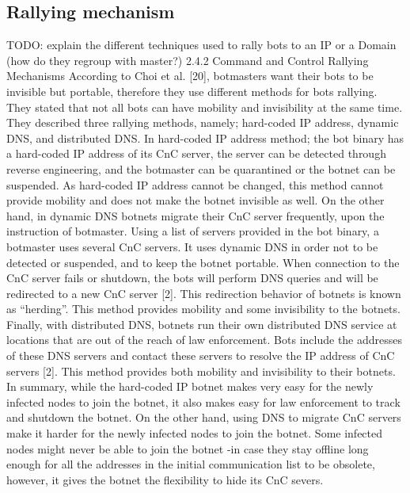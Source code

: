\subsection{Rallying mechanism}
TODO: explain the different techniques used to rally bots to an IP or a Domain (how do they regroup with master?)
2.4.2 Command and Control Rallying Mechanisms
According to Choi et al. [20], botmasters want their bots
to be invisible but portable, therefore they use different
methods for bots rallying. They stated that not all bots
can have mobility and invisibility at the same time. They
described three rallying methods, namely; hard-coded IP
address, dynamic DNS, and distributed DNS.
In hard-coded IP address method; the bot binary has a
hard-coded IP address of its CnC server, the server can be
detected through reverse engineering, and the botmaster
can be quarantined or the botnet can be suspended. As
hard-coded IP address cannot be changed, this method
cannot provide mobility and does not make the botnet
invisible as well. On the other hand, in dynamic DNS
botnets migrate their CnC server frequently, upon the
instruction of botmaster. Using a list of servers provided
in the bot binary, a botmaster uses several CnC servers.
It uses dynamic DNS in order not to be detected or suspended,
and to keep the botnet portable. When connection
to the CnC server fails or shutdown, the bots will
perform DNS queries and will be redirected to a new CnC
server [2]. This redirection behavior of botnets is known
as “herding”. This method provides mobility and some
invisibility to the botnets. Finally, with distributed DNS,
botnets run their own distributed DNS service at locations
that are out of the reach of law enforcement. Bots
include the addresses of these DNS servers and contact
these servers to resolve the IP address of CnC servers
[2]. This method provides both mobility and invisibility
to their botnets.
In summary, while the hard-coded IP botnet makes
very easy for the newly infected nodes to join the botnet,
it also makes easy for law enforcement to track and
shutdown the botnet. On the other hand, using DNS to
migrate CnC servers make it harder for the newly infected
nodes to join the botnet. Some infected nodes might never
be able to join the botnet -in case they stay offline long
enough for all the addresses in the initial communication
list to be obsolete, however, it gives the botnet the flexibility
to hide its CnC severs.

